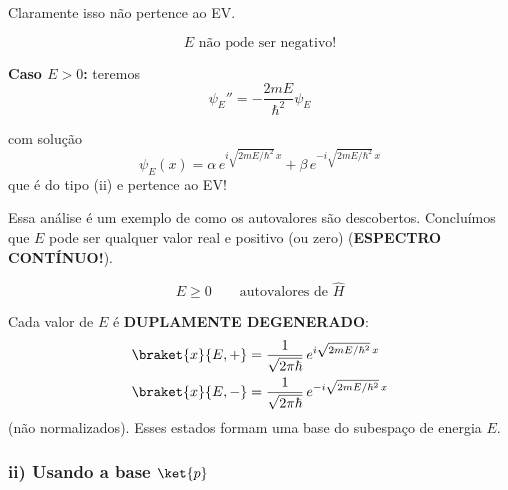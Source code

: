 Claramente isso não pertence ao EV.

\begin{equation}
    \boxed{E \text{ não pode ser negativo!}}
\label{eq:aula14_E_nao_negativo}
\end{equation}

\textbf{Caso $E > 0$:} teremos
\begin{equation}
    \psi_E'' = -\frac{2mE}{\hbar^2}\psi_E
\label{eq:aula14_eq_E_positivo}
\end{equation}


com solução
\begin{equation}
    \psi_E(x) = \alpha\, e^{i\sqrt{2mE/\hbar^2}\,x} + \beta\, e^{-i\sqrt{2mE/\hbar^2}\,x}
\label{eq:aula14_solucao_E_positivo}
\end{equation}
que é do tipo (ii) e pertence ao EV!

Essa análise é um exemplo de como os autovalores são descobertos. Concluímos que $E$ pode ser qualquer valor real e positivo (ou zero) (\textbf{ESPECTRO CONTÍNUO!}).

\begin{equation}
    \boxed{E \geq 0} \qquad \text{autovalores de } \hat{H}
\label{eq:aula14_espectro_H}
\end{equation}

Cada valor de $E$ é \textbf{DUPLAMENTE DEGENERADO}:
\begin{align}
    \braket{x}{E,+} &= \frac{1}{\sqrt{2\pi\hbar}}\, e^{i\sqrt{2mE/\hbar^2}\,x} \label{eq:aula14_ket_E_mais} \\
    \braket{x}{E,-} &= \frac{1}{\sqrt{2\pi\hbar}}\, e^{-i\sqrt{2mE/\hbar^2}\,x} \label{eq:aula14_ket_E_menos}
\end{align}
(não normalizados). Esses estados formam uma base do subespaço de energia $E$.


\subsubsection*{ii) Usando a base $\ket{p}$}

